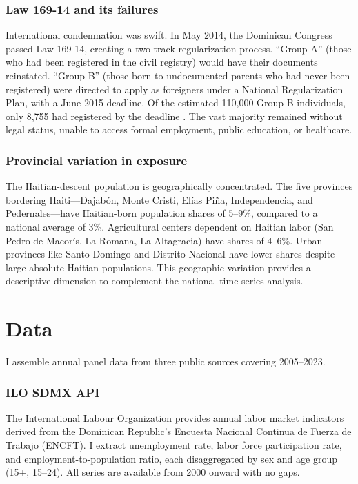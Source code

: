 \documentclass[12pt]{article}
\begin{document}
\subsubsection*{Law 169-14 and its failures}
International condemnation was swift. In May 2014, the Dominican Congress passed Law 169-14, creating a two-track regularization process. ``Group A'' (those who had been registered in the civil registry) would have their documents reinstated. ``Group B'' (those born to undocumented parents who had never been registered) were directed to apply as foreigners under a National Regularization Plan, with a June 2015 deadline. Of the estimated 110,000 Group B individuals, only 8,755 had registered by the deadline \citep{one2018eni}. The vast majority remained without legal status, unable to access formal employment, public education, or healthcare.

\subsubsection*{Provincial variation in exposure}
The Haitian-descent population is geographically concentrated. The five provinces bordering Haiti---Dajab\'{o}n, Monte Cristi, El\'{i}as Pi\~{n}a, Independencia, and Pedernales---have Haitian-born population shares of 5--9\%, compared to a national average of 3\%. Agricultural centers dependent on Haitian labor (San Pedro de Macor\'{i}s, La Romana, La Altagracia) have shares of 4--6\%. Urban provinces like Santo Domingo and Distrito Nacional have lower shares despite large absolute Haitian populations. This geographic variation provides a descriptive dimension to complement the national time series analysis.

\section{Data}

I assemble annual panel data from three public sources covering 2005--2023.

\subsubsection*{ILO SDMX API}
The International Labour Organization provides annual labor market indicators derived from the Dominican Republic's Encuesta Nacional Continua de Fuerza de Trabajo (ENCFT). I extract unemployment rate, labor force participation rate, and employment-to-population ratio, each disaggregated by sex and age group (15+, 15--24). All series are available from 2000 onward with no gaps.
\end{document}
